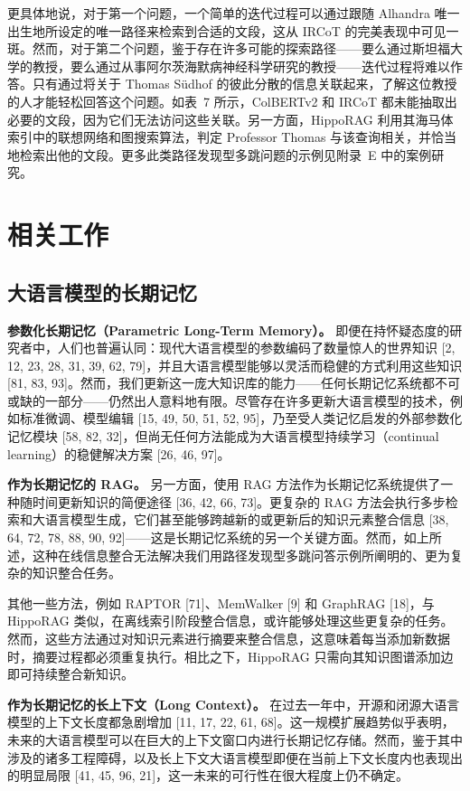 \documentclass[11pt,UTF8,fontset=fandol]{ctexart}
\begin{document}
更具体地说，对于第一个问题，一个简单的迭代过程可以通过跟随 Alhandra 唯一出生地所设定的唯一路径来检索到合适的文段，这从 IRCoT 的完美表现中可见一斑。然而，对于第二个问题，鉴于存在许多可能的探索路径——要么通过斯坦福大学的教授，要么通过从事阿尔茨海默病神经科学研究的教授——迭代过程将难以作答。只有通过将关于 Thomas Südhof 的彼此分散的信息关联起来，了解这位教授的人才能轻松回答这个问题。如表~7 所示，ColBERTv2 和 IRCoT 都未能抽取出必要的文段，因为它们无法访问这些关联。另一方面，HippoRAG 利用其海马体索引中的联想网络和图搜索算法，判定 Professor Thomas 与该查询相关，并恰当地检索出他的文段。更多此类路径发现型多跳问题的示例见附录~E 中的案例研究。

\section{相关工作}
\subsection{大语言模型的长期记忆}

\textbf{参数化长期记忆（Parametric Long-Term Memory）。} 即便在持怀疑态度的研究者中，人们也普遍认同：现代大语言模型的参数编码了数量惊人的世界知识 [2, 12, 23, 28, 31, 39, 62, 79]，并且大语言模型能够以灵活而稳健的方式利用这些知识 [81, 83, 93]。然而，我们更新这一庞大知识库的能力——任何长期记忆系统都不可或缺的一部分——仍然出人意料地有限。尽管存在许多更新大语言模型的技术，例如标准微调、模型编辑 [15, 49, 50, 51, 52, 95]，乃至受人类记忆启发的外部参数化记忆模块 [58, 82, 32]，但尚无任何方法能成为大语言模型持续学习（continual learning）的稳健解决方案 [26, 46, 97]。

\textbf{作为长期记忆的 RAG。} 另一方面，使用 RAG 方法作为长期记忆系统提供了一种随时间更新知识的简便途径 [36, 42, 66, 73]。更复杂的 RAG 方法会执行多步检索和大语言模型生成，它们甚至能够跨越新的或更新后的知识元素整合信息 [38, 64, 72, 78, 88, 90, 92]——这是长期记忆系统的另一个关键方面。然而，如上所述，这种在线信息整合无法解决我们用路径发现型多跳问答示例所阐明的、更为复杂的知识整合任务。

其他一些方法，例如 RAPTOR [71]、MemWalker [9] 和 GraphRAG [18]，与 HippoRAG 类似，在离线索引阶段整合信息，或许能够处理这些更复杂的任务。然而，这些方法通过对知识元素进行摘要来整合信息，这意味着每当添加新数据时，摘要过程都必须重复执行。相比之下，HippoRAG 只需向其知识图谱添加边即可持续整合新知识。

\textbf{作为长期记忆的长上下文（Long Context）。} 在过去一年中，开源和闭源大语言模型的上下文长度都急剧增加 [11, 17, 22, 61, 68]。这一规模扩展趋势似乎表明，未来的大语言模型可以在巨大的上下文窗口内进行长期记忆存储。然而，鉴于其中涉及的诸多工程障碍，以及长上下文大语言模型即便在当前上下文长度内也表现出的明显局限 [41, 45, 96, 21]，这一未来的可行性在很大程度上仍不确定。
\end{document}

